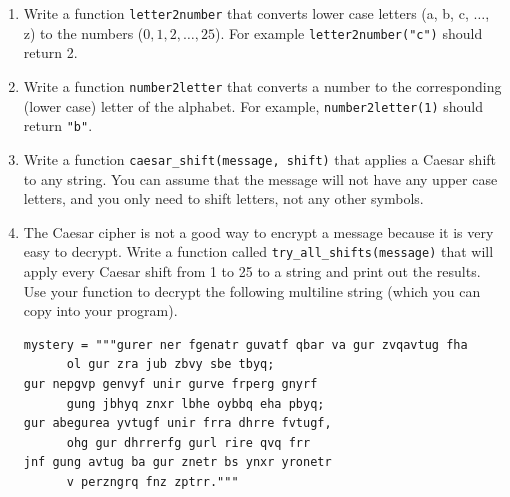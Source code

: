 \documentclass[12pt]{article}
\begin{document}
\begin{enumerate}
\item Write a function \verb|letter2number| that converts lower case letters (a, b, c, $\ldots$, z) to the numbers ($0, 1, 2, \ldots, 25$).  For example \verb|letter2number("c")| should return 2.


\item Write a function \verb|number2letter| that converts a number to the corresponding (lower case) letter of the alphabet. For example, \verb|number2letter(1)| should return \verb|"b"|.




\item Write a function \verb|caesar_shift(message, shift)| that applies a Caesar shift to any string.  You can assume that the message will not have any upper case letters, and you only need to shift letters, not any other symbols. 

\item The Caesar cipher is not a good way to encrypt a message because it is very easy to decrypt.  Write a function called \verb|try_all_shifts(message)| that will apply every Caesar shift from 1 to 25 to a string and print out the results.  Use your function to decrypt the following multiline string (which you can copy into your program).

\begin{verbatim}
mystery = """gurer ner fgenatr guvatf qbar va gur zvqavtug fha
      ol gur zra jub zbvy sbe tbyq;
gur nepgvp genvyf unir gurve frperg gnyrf
      gung jbhyq znxr lbhe oybbq eha pbyq;
gur abegurea yvtugf unir frra dhrre fvtugf,
      ohg gur dhrrerfg gurl rire qvq frr
jnf gung avtug ba gur znetr bs ynxr yronetr
      v perzngrq fnz zptrr."""
\end{verbatim}



\end{enumerate}
\end{document}
